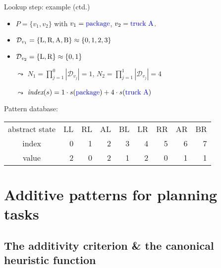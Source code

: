 \documentclass{gkibeamer}
\begin{document}
\begin{frame}{Lookup step: example (ctd.)}
  \begin{itemize}
  \item $P = \{v_1, v_2\}$ with $v_1 = \text{{\color{blue} package}}$,
    $v_2 = \text{{\color{blue} truck A}}$.
  \item $\mathcal D_{v_1} = \{\text{L}, \text{R}, \text{A}, \text{B}\}
    \approx \{0, 1, 2, 3\}$
  \item $\mathcal D_{v_2} = \{\text{L}, \text{R}\}
    \approx \{0, 1\}$
  \end{itemize}
  
  \smallskip

  \begin{itemize}
  \item[$\leadsto$] $N_1 = \prod_{j=1}^0 |\mathcal D_{v_j}| = 1$,
    $N_2 = \prod_{j=1}^1 |\mathcal D_{v_j}| = 4$
  \item[$\leadsto$] $\textit{index}(s) =
    1 \cdot s(\text{{\color{blue} package}})
    + 4 \cdot s(\text{{\color{blue} truck A}})$
  \end{itemize}

  Pattern database:
  \smallskip

  \begin{tabular}{@{}c|rrrrrrrr@{}}
    abstract state & LL & RL & AL & BL & LR & RR & AR & BR \\
    index & 0 & 1 & 2 & 3 & 4 & 5 & 6 & 7 \\
    value & 2 & 0 & 2 & 1 & 2 & 0 & 1 & 1
  \end{tabular}
\end{frame}

\section[Additivity]{Additive patterns for planning tasks}
\subsection[Canonical heuristic function]{The additivity criterion \&
  the canonical heuristic function}
\end{document}
